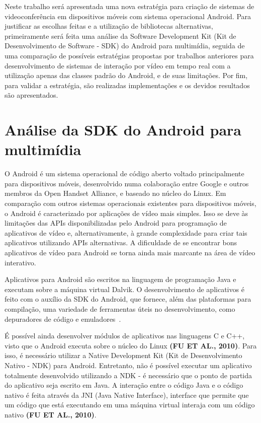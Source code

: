 \documentclass{acm_proc_article-sp}
\newcommand{\todo}[1]{\textcolor[rgb]{1.00,0.00,0.00}{\bf \uppercase{#1}}}
\begin{document}
Neste trabalho será apresentada uma nova estratégia para criação de sistemas de videoconferência em dispositivos móveis com sistema operacional Android. Para justificar as escolhas feitas e a utilização de bibliotecas alternativas, primeiramente será feita uma análise da Software Development Kit (Kit de Desenvolvimento de Software - SDK) do Android para multimídia, seguida de uma comparação de possíveis estratégias propostas por trabalhos anteriores para desenvolvimento de sistemas de interação por vídeo em tempo real com a utilização apenas das classes padrão do Android, e de suas limitações. Por fim, para validar a estratégia, são realizadas implementações e os devidos resultados são apresentados.

\section{Análise da SDK do Android para multimídia}

O Android é um sistema operacional de código aberto voltado principalmente para dispositivos móveis, desenvolvido numa colaboração entre Google e outros membros da Open Handset Alliance, e baseado no núcleo do Linux. Em comparação com outros sistemas operacionais existentes para dispositivos móveis, o Android é caracterizado por aplicações de vídeo mais simples. Isso se deve às limitações das APIs disponibilizadas pelo Android para programação de aplicativos de vídeo e, alternativamente, à grande complexidade para criar tais aplicativos utilizando APIs alternativas. A dificuldade de se encontrar bons aplicativos de vídeo para Android se torna ainda mais marcante na área de vídeo interativo.

Aplicativos para Android são escritos na linguagem de programação Java e executam sobre a máquina virtual Dalvik. O desenvolvimento de aplicativos é feito com o auxílio da SDK do Android, que fornece, além das plataformas para compilação, uma variedade de ferramentas úteis no desenvolvimento, como depuradores de código e emuladores~\cite{ableson_2009}. 

É possível ainda desenvolver módulos de aplicativos nas linguagens C e C++, visto que o Android executa sobre o núcleo do Linux \todo{(FU et al., 2010)}. Para isso, é necessário utilizar a Native Development Kit (Kit de Desenvolvimento Nativo - NDK) para Android. Entretanto, não é possível executar um aplicativo totalmente desenvolvido utilizando a NDK - é necessário que o ponto de partida do aplicativo seja escrito em Java. A interação entre o código Java e o código nativo é feita através da JNI (Java Native Interface), interface que permite que um código que está executando em uma máquina virtual interaja com um código nativo \todo{(FU et al., 2010)}.
\end{document}
